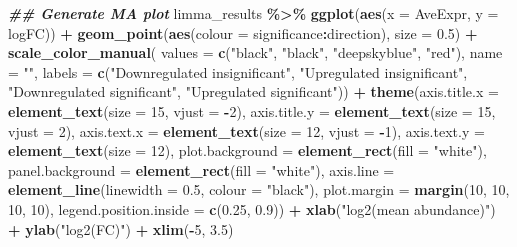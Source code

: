 \documentclass[9pt,a4paper,]{extarticle}
\newenvironment{Shaded}{\begin{snugshade}}{\end{snugshade}}
\newcommand{\AttributeTok}[1]{\textcolor[rgb]{0.13,0.29,0.53}{#1}}
\newcommand{\DecValTok}[1]{\textcolor[rgb]{0.00,0.00,0.81}{#1}}
\newcommand{\DocumentationTok}[1]{\textcolor[rgb]{0.56,0.35,0.01}{\textbf{\textit{#1}}}}
\newcommand{\FloatTok}[1]{\textcolor[rgb]{0.00,0.00,0.81}{#1}}
\newcommand{\FunctionTok}[1]{\textcolor[rgb]{0.13,0.29,0.53}{\textbf{#1}}}
\newcommand{\NormalTok}[1]{#1}
\newcommand{\SpecialCharTok}[1]{\textcolor[rgb]{0.81,0.36,0.00}{\textbf{#1}}}
\newcommand{\StringTok}[1]{\textcolor[rgb]{0.31,0.60,0.02}{#1}}
\begin{document}
\begin{Shaded}
\begin{Highlighting}[]
\DocumentationTok{\#\# Generate MA plot}
\NormalTok{limma\_results }\SpecialCharTok{\%\textgreater{}\%}
  \FunctionTok{ggplot}\NormalTok{(}\FunctionTok{aes}\NormalTok{(}\AttributeTok{x =}\NormalTok{ AveExpr, }\AttributeTok{y =}\NormalTok{ logFC)) }\SpecialCharTok{+}
  \FunctionTok{geom\_point}\NormalTok{(}\FunctionTok{aes}\NormalTok{(}\AttributeTok{colour =}\NormalTok{ significance}\SpecialCharTok{:}\NormalTok{direction), }\AttributeTok{size =} \FloatTok{0.5}\NormalTok{) }\SpecialCharTok{+}
  \FunctionTok{scale\_color\_manual}\NormalTok{(}
    \AttributeTok{values =} \FunctionTok{c}\NormalTok{(}\StringTok{"black"}\NormalTok{, }\StringTok{"black"}\NormalTok{, }\StringTok{"deepskyblue"}\NormalTok{, }\StringTok{"red"}\NormalTok{), }\AttributeTok{name =} \StringTok{""}\NormalTok{,}
    \AttributeTok{labels =} \FunctionTok{c}\NormalTok{(}\StringTok{"Downregulated insignificant"}\NormalTok{,}
               \StringTok{"Upregulated insignificant"}\NormalTok{,}
               \StringTok{"Downregulated significant"}\NormalTok{,}
               \StringTok{"Upregulated significant"}\NormalTok{)) }\SpecialCharTok{+}
  \FunctionTok{theme}\NormalTok{(}\AttributeTok{axis.title.x =} \FunctionTok{element\_text}\NormalTok{(}\AttributeTok{size =} \DecValTok{15}\NormalTok{, }\AttributeTok{vjust =} \SpecialCharTok{{-}}\DecValTok{2}\NormalTok{),}
        \AttributeTok{axis.title.y =} \FunctionTok{element\_text}\NormalTok{(}\AttributeTok{size =} \DecValTok{15}\NormalTok{, }\AttributeTok{vjust =} \DecValTok{2}\NormalTok{),}
        \AttributeTok{axis.text.x =} \FunctionTok{element\_text}\NormalTok{(}\AttributeTok{size =} \DecValTok{12}\NormalTok{, }\AttributeTok{vjust =} \SpecialCharTok{{-}}\DecValTok{1}\NormalTok{),}
        \AttributeTok{axis.text.y =} \FunctionTok{element\_text}\NormalTok{(}\AttributeTok{size =} \DecValTok{12}\NormalTok{),}
        \AttributeTok{plot.background =} \FunctionTok{element\_rect}\NormalTok{(}\AttributeTok{fill =} \StringTok{"white"}\NormalTok{),}
        \AttributeTok{panel.background =} \FunctionTok{element\_rect}\NormalTok{(}\AttributeTok{fill =} \StringTok{"white"}\NormalTok{),}
        \AttributeTok{axis.line =} \FunctionTok{element\_line}\NormalTok{(}\AttributeTok{linewidth =} \FloatTok{0.5}\NormalTok{, }\AttributeTok{colour =} \StringTok{"black"}\NormalTok{),}
        \AttributeTok{plot.margin =} \FunctionTok{margin}\NormalTok{(}\DecValTok{10}\NormalTok{, }\DecValTok{10}\NormalTok{, }\DecValTok{10}\NormalTok{, }\DecValTok{10}\NormalTok{),}
        \AttributeTok{legend.position.inside =} \FunctionTok{c}\NormalTok{(}\FloatTok{0.25}\NormalTok{, }\FloatTok{0.9}\NormalTok{)) }\SpecialCharTok{+}
  \FunctionTok{xlab}\NormalTok{(}\StringTok{"log2(mean abundance)"}\NormalTok{) }\SpecialCharTok{+}
  \FunctionTok{ylab}\NormalTok{(}\StringTok{"log2(FC)"}\NormalTok{) }\SpecialCharTok{+}
  \FunctionTok{xlim}\NormalTok{(}\SpecialCharTok{{-}}\DecValTok{5}\NormalTok{, }\FloatTok{3.5}\NormalTok{)}
\end{Highlighting}
\end{Shaded}
\end{document}
